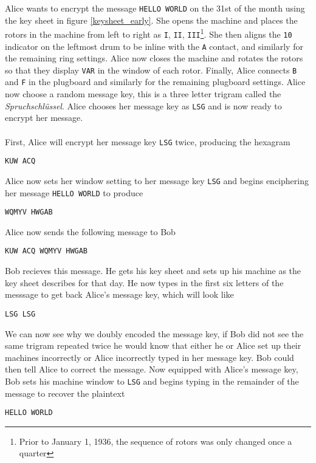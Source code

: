 \noindent Alice wants to encrypt the message \texttt{HELLO WORLD} on
the 31st of the month using the key sheet in figure
\ref{keysheet_early}. She opens the machine and places the rotors in
the machine from left to right as \texttt{I}, \texttt{II},
\texttt{III}\footnote{Prior to January 1, 1936, the sequence of
	rotors was only changed once a quarter}. She then aligns the
\texttt{10} indicator on the
leftmost drum to be inline with the \texttt{A} contact, and similarly
for the remaining ring settings. Alice now closes the machine and
rotates the rotors so that they display \texttt{VAR} in the window of
each rotor. Finally, Alice connects \texttt{B} and \texttt{F} in the
plugboard and similarly for the remaining plugboard settings. Alice
now choose a random message key, this is a three letter trigram
called the \emph{Spruchschlüssel}. Alice chooses her message key as
\texttt{LSG} and is now ready to encrypt her message.
\\\\First, Alice will encrypt her message key \texttt{LSG} twice,
producing the hexagram
\begin{center}
	\texttt{KUW ACQ}
\end{center}
\noindent Alice now sets her window setting to her message key
\texttt{LSG} and begins enciphering her message \texttt{HELLO WORLD} to produce
\begin{center}
	\texttt{WQMYV HWGAB}
\end{center}
Alice now sends the following message to Bob
\begin{center}
	\texttt{KUW ACQ WQMYV HWGAB}
\end{center}
\noindent Bob recieves this message. He gets his key sheet and sets
up his machine as the key sheet describes for that day. He now types
in the first six letters of the messsage to get back Alice's message
key, which will look like
\begin{center}
	\texttt{LSG LSG}
\end{center}
We can now see why we doubly encoded the message key, if Bob did not
see the same trigram repeated twice he would know that either he or
Alice set up their machines incorrectly or Alice incorrectly typed in
her message key. Bob could then tell Alice to correct the message.
Now equipped with Alice's message key, Bob sets his machine window to
\texttt{LSG} and begins typing in the remainder of the message to
recover the plaintext
\begin{center}
	\texttt{HELLO WORLD}
\end{center}
